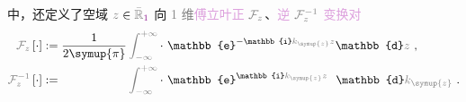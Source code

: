  中，还定义了空域 $\mathcolor{gray}{z} \in \mathcolor{gray}{\bar{\mathbb{R}}_{\textcolor{Plum}{1}}}$ 向 \textcolor{gray}{1 维}\textcolor{Plum}{傅立叶正} $\mathcolor{gray}{\mathcal F_{z}}$、\textcolor{Plum}{逆} $\mathcolor{gray}{\mathcal F_{z}^{-1}}$ \textcolor{Plum}{变换对}
\begin{subequations} \label{eq:FT-z_kz}
\begin{align}
	\mathcolor{gray}{\mathcal F_{z}} \left[ \cdot \right] &:= \frac{ 1 }{ 2\symup{\pi} } \mathcolor{gray}{\int_{-\infty}^{+\infty}} \cdot~ \mathbb{e}^{-\mathbb{i}\mathcolor{gray}{k_{\symup{z}}} \mathcolor{gray}{z}} \mathbb{d}\mathcolor{gray}{z} ~, \label{eq:FT-kz} \\
	\mathcolor{gray}{\mathcal F_{z}^{-1}} \left[ \cdot \right] &:= \hphantom{\frac{ 1 }{ 2\symup{\pi} }} \mathcolor{gray}{\int_{-\infty}^{+\infty}} \cdot~ \mathbb{e}^{\mathbb{i}\mathcolor{gray}{k_{\symup{z}}} \mathcolor{gray}{z}} \hphantom{^-} \mathbb{d}\mathcolor{gray}{k_{\symup{z}}} ~. \label{eq:IFT-z}
\end{align}
\end{subequations}

